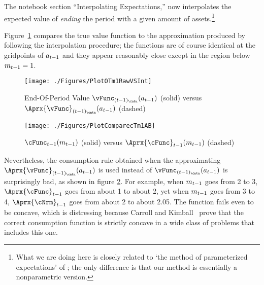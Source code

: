 \documentclass[\econtexRoot/SolvingMicroDSOPs]{subfiles}
\begin{document}
The notebook section ``Interpolating Expectations,'' now interpolates the expected value of \textit{ending} the period with a given amount of assets.\footnote{What we are doing here is closely related to `the method of parameterized expectations' of \cite{denHaanMarcet:parameterized}; the only difference is that our method is essentially a nonparametric version.}  %

Figure~\ref{fig:PlotOTm1RawVSInt} compares the true value function to the approximation produced by following the interpolation procedure; the functions are of course identical at the gridpoints of ${a}_{t-1}$ and they appear reasonably close except in the region below ${m}_{t-1}=1$.

\hypertarget{PlotOTm1RawVSInt}{}
\begin{figure}
  \centerline{\texttt{[image: ./Figures/PlotOTm1RawVSInt]}}
  \caption{End-Of-Period Value $\vFunc_{({\prdT-1})_\cntn}({a}_{\prdT-1})$ (solid) versus $\Aprx{\vFunc}_{({\prdT-1})_\cntn}({a}_{\prdT-1})$ (dashed)}
  \label{fig:PlotOTm1RawVSInt}
\end{figure}

\hypertarget{PlotComparecTm1AB}{}
\begin{figure}
  \centerline{\texttt{[image: ./Figures/PlotComparecTm1AB]}}
  \caption{$\cFunc_{\prdT-1}({m}_{\prdT-1})$ (solid) versus $\Aprx{\cFunc}_{\prdT-1}({m}_{\prdT-1})$ (dashed)}
  \label{fig:PlotComparecTm1AB}
\end{figure}


Nevertheless, the consumption rule obtained when the approximating $\Aprx{\vFunc}_{({\prdT-1})_\cntn}({a}_{\prdT-1})$ is used instead of $\vFunc_{({\prdT-1})_\cntn}({a}_{\prdT-1})$ is surprisingly bad, as shown in figure \ref{fig:PlotComparecTm1AB}.  For example, when ${m}_{t-1}$ goes from 2 to 3, $\Aprx{\cFunc}_{\prdT-1}$ goes from about 1 to about 2, yet when ${m}_{t-1}$ goes from 3 to 4, $\Aprx{\cNrm}_{\prdT-1}$ goes from about 2 to about 2.05.  The function fails even to be concave, which is distressing because Carroll and Kimball~\citeyearpar{ckConcavity} prove that the correct consumption function is strictly concave in a wide class of problems that includes this one.
\end{document}
